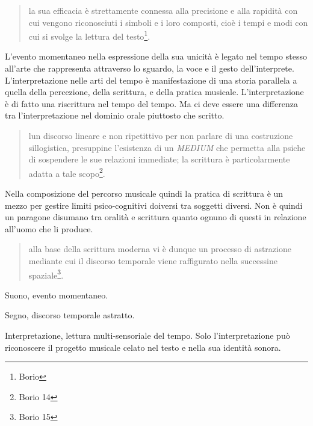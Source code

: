 \begin{quote}
	la sua efficacia è strettamente connessa alla precisione e alla rapidità con cui vengono riconosciuti i simboli e i loro composti, cioè i tempi e modi con cui si svolge la lettura del testo\footnote{Borio}.
\end{quote}

L'evento momentaneo nella espressione della sua unicità è legato nel tempo stesso all'arte che rappresenta attraverso lo sguardo, la voce e il gesto dell'interprete. L'interpretazione nelle arti del tempo è manifestazione di una storia parallela a quella della percezione, della scrittura, e della pratica musicale. L'interpretazione è di fatto una riscrittura nel tempo del tempo. Ma ci deve essere una differenza tra l'interpretazione nel dominio orale piuttosto che scritto.

\begin{quote}
	lun discorso lineare e non ripetittivo per non parlare di una costruzione sillogistica, presuppine l'esistenza di un \emph{MEDIUM} che permetta alla psiche di sospendere le sue relazioni immediate; la scrittura è particolarmente adatta a tale scopo\footnote{Borio 14}.
\end{quote}

Nella composizione del percorso musicale quindi la pratica di scrittura è un mezzo per gestire limiti psico-cognitivi doiversi tra soggetti diversi. Non è quindi un paragone disumano tra oralità e scrittura quanto ognuno di questi in relazione all'uomo che li produce.

\begin{quote}
	alla base della scrittura moderna vi è dunque un processo di astrazione mediante cui il discorso temporale viene raffigurato nella successine spaziale\footnote{Borio 15}.
\end{quote}

Suono, evento momentaneo.

Segno, discorso temporale astratto.

Interpretazione, lettura multi-sensoriale del tempo. Solo l'interpretazione può riconoscere il progetto musicale celato nel testo e nella sua identità sonora.

\begin{center}
\end{center}

